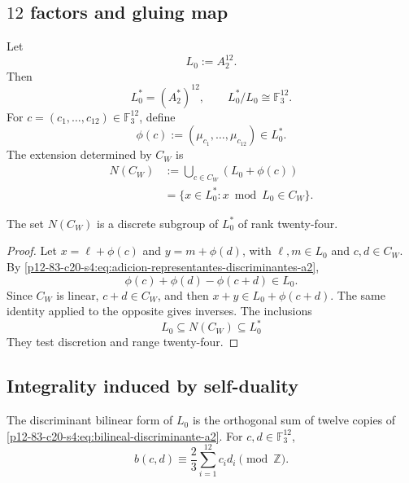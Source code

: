 \subsection{\(12\) factors and gluing map}

Let
\[
 L_0:=A_2^{12}.
\]
Then
\[
 L_0^*=(A_2^*)^{12},
 \qquad
 L_0^*/L_0\cong\mathbb F_3^{12}.
\]
For \(c=(c_1,\ldots,c_{12})\in\mathbb F_3^{12}\), define
\begin{equation}
 \phi(c):=(\mu_{c_1},\ldots,\mu_{c_{12}})\in L_0^*.
 \label{p12-83-c20-s4:eq:aplicacion-pegado-cw}
\end{equation}
The extension determined by \(C_W\) is
\begin{equation}
 \begin{aligned}
 N(C_W)
 &:=\bigcup_{c\in C_W}(L_0+\phi(c))\\
 &=\{x\in L_0^*:x\bmod L_0\in C_W\}.
 \end{aligned}
 \label{p12-83-c20-s4:eq:definicion-niemeier-cw}
\end{equation}

\begin{lemma}
\label{p12-83-c20-s4:lem:clausura-pegado-cw}
The set \(N(C_W)\) is a discrete subgroup of \(L_0^*\) of rank
twenty-four.
\end{lemma}

\begin{proof}
Let \(x=\ell+\phi(c)\) and \(y=m+\phi(d)\), with \(\ell,m\in L_0\) and
\(c,d\in C_W\). By \eqref{p12-83-c20-s4:eq:adicion-representantes-discriminantes-a2},
\[
 \phi(c)+\phi(d)-\phi(c+d)\in L_0.
\]
Since \(C_W\) is linear, \(c+d\in C_W\), and then
\(x+y\in L_0+\phi(c+d)\). The same identity applied to the opposite gives
inverses. The inclusions
\[
 L_0\subseteq N(C_W)\subseteq L_0^*
\]
They test discretion and range twenty-four.
\end{proof}

\subsection{Integrality induced by self-duality}

The discriminant bilinear form of \(L_0\) is the orthogonal sum of twelve
copies of \eqref{p12-83-c20-s4:eq:bilineal-discriminante-a2}. For
\(c,d\in\mathbb F_3^{12}\),
\begin{equation}
 b(c,d)
 \equiv\frac23\sum_{i=1}^{12}c_id_i
 \pmod{\mathbb Z}.
 \label{p12-83-c20-s4:eq:bilineal-discriminante-a2-doce}
\end{equation}

